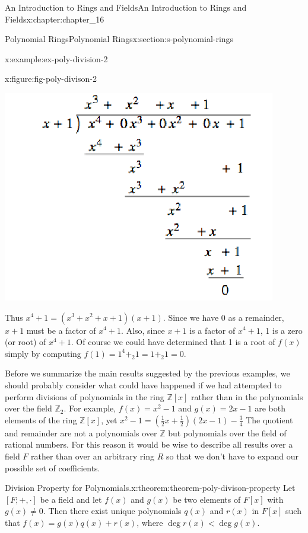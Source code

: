 \documentclass[oneside,10pt,]{book}
\numberwithin{equation}{section}
\begin{document}
\begin{chapterptx}{An Introduction to Rings and Fields}{}{An Introduction to Rings and Fields}{}{}{x:chapter:chapter_16}
\begin{sectionptx}{Polynomial Rings}{}{Polynomial Rings}{}{}{x:section:s-polynomial-rings}
\begin{example}{}{x:example:ex-poly-division-2}
\begin{figureptx}{}{x:figure:fig-poly-divison-2}{}
\begin{image}{0.225}{0.55}{0.225}
\includegraphics[width=\linewidth]{images/fig-poly-divison-2.png}
\end{image}%
\tcblower
\end{figureptx}%
Thus \(x^4+ 1 = \left(x^3+x^2+ x + 1\right)(x+1) \). Since we have 0 as a remainder, \(x + 1\) must be a factor of \(x^4+ 1\). Also, since \(x + 1\) is a factor of \(x^4 +
1\),  1 is a zero (or root) of \(x^4 + 1\).   Of course we could have determined that 1 is a root of \(f(x)\) simply by computing   \(f(1)
=1^4 +_2 1 = 1 +_2 1 = 0\).%
\end{example}
Before we summarize the main results suggested by the previous examples, we should probably consider what could have happened if we had  attempted to perform divisions of polynomials in the ring \(\mathbb{Z}[x]\) rather than in the polynomials over the field \(\mathbb{Z}_2\). For example, \(f(x) = x^2 - 1\) and \(g(x)
= 2x - 1\) are  both elements of the ring \(\mathbb{Z}[x]\), yet \(x^2-1=(\frac{1}{2} x+\frac{1}{2})(2x-1)-\frac{3}{4}\) The quotient and remainder are not a polynomials over \(\mathbb{Z}\) but polynomials over the field of rational numbers. For this reason it would be wise to describe all results over a field \(F\) rather than over an arbitrary ring \(R\) so that we don't have to expand our possible set of coefficients.%
\begin{theorem}{Division Property for Polynomials.}{}{x:theorem:theorem-poly-divison-property}%
%
Let \([F; +, \cdot ]\) be a field and let \(f(x)\) and \(g(x)\) be two elements of \(F[x]\) with \(g(x) \neq  0\). Then there exist unique polynomials \(q(x)\) and \(r(x)\) in \(F[x]\) such that \(f(x) = g(x) q(x) + r(x)\), where \(\deg  r(x) < \deg  g(x)\).%

\end{theorem}
\end{sectionptx}
\end{chapterptx}
\end{document}
